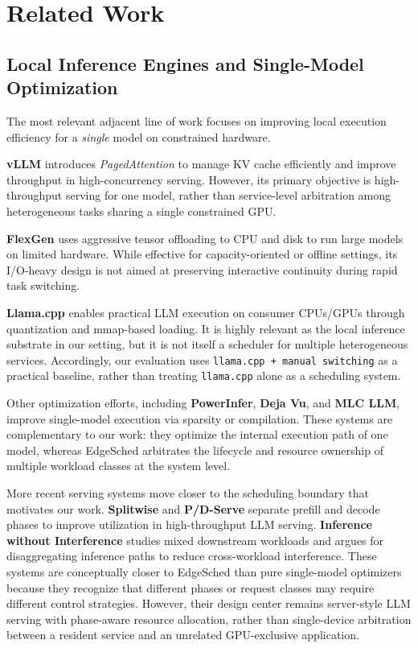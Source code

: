 \section{Related Work}

\subsection{Local Inference Engines and Single-Model Optimization}

The most relevant adjacent line of work focuses on improving local execution efficiency for a \emph{single} model on constrained hardware.

\textbf{vLLM}\cite{kwon2023vllm} introduces \textit{PagedAttention} to manage KV cache efficiently and improve throughput in high-concurrency serving. However, its primary objective is high-throughput serving for one model, rather than service-level arbitration among heterogeneous tasks sharing a single constrained GPU.

\textbf{FlexGen}\cite{sheng2023flexgen} uses aggressive tensor offloading to CPU and disk to run large models on limited hardware. While effective for capacity-oriented or offline settings, its I/O-heavy design is not aimed at preserving interactive continuity during rapid task switching.

\textbf{Llama.cpp}\cite{llamacpp} enables practical LLM execution on consumer CPUs/GPUs through quantization and mmap-based loading. It is highly relevant as the local inference substrate in our setting, but it is not itself a scheduler for multiple heterogeneous services. Accordingly, our evaluation uses \texttt{llama.cpp + manual switching} as a practical baseline, rather than treating \texttt{llama.cpp} alone as a scheduling system.

Other optimization efforts, including \textbf{PowerInfer}\cite{song2023powerinfer}, \textbf{Deja Vu}\cite{liu2023dejavu}, and \textbf{MLC LLM}\cite{wu2023mlc}, improve single-model execution via sparsity or compilation. These systems are complementary to our work: they optimize the internal execution path of one model, whereas EdgeSched arbitrates the lifecycle and resource ownership of multiple workload classes at the system level.

More recent serving systems move closer to the scheduling boundary that motivates our work. \textbf{Splitwise}\cite{patel2024splitwise} and \textbf{P/D-Serve}\cite{jin2024pdserve} separate prefill and decode phases to improve utilization in high-throughput LLM serving. \textbf{Inference without Interference}\cite{hu2024interference} studies mixed downstream workloads and argues for disaggregating inference paths to reduce cross-workload interference. These systems are conceptually closer to EdgeSched than pure single-model optimizers because they recognize that different phases or request classes may require different control strategies. However, their design center remains server-style LLM serving with phase-aware resource allocation, rather than single-device arbitration between a resident service and an unrelated GPU-exclusive application.

